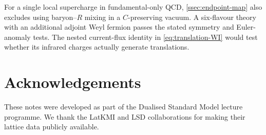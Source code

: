 \documentclass[11pt,a4paper]{article}
\theoremstyle{plain}
\theoremstyle{definition}
\theoremstyle{remark}
\begin{document}
For a single local supercharge in fundamental-only QCD,
\cref{ssec:endpoint-map} also excludes using baryon--$R$ mixing in a
$C$-preserving vacuum. A six-flavour theory with an additional adjoint
Weyl fermion passes the stated symmetry and Euler-anomaly tests.
The nested current-flux identity in \cref{eq:translation-WI} would
test whether its infrared charges actually generate translations.

\section*{Acknowledgements}

These notes were developed as part of the Dualised Standard Model
lecture programme.  We thank the LatKMI and LSD collaborations for
making their lattice data publicly available.
\end{document}

